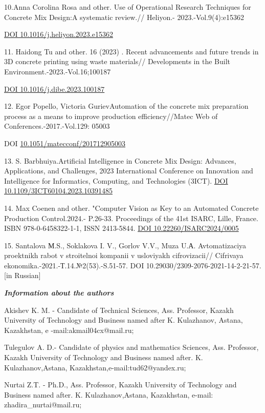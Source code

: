 {10.Anna Corolina Rosa and other. Use of Operational Research Techniques
for Concrete Mix Design:A systematic review.// Heliyon.-
2023.-Vol.9(4):e15362

\href{https://doi.org/10.1016/j.heliyon.2023.e15362}{DOI
10.1016/j.heliyon.2023.e15362}

11. Haidong Tu and other. 16 (2023) . Recent advancements and future
trends in 3D concrete printing using waste materials// Developments in
the Built Environment.-2023.-Vol.16;100187

\href{https://doi.org/10.1016/j.dibe.2023.100187}{DOI
10.1016/j.dibe.2023.100187}

12. Egor Popello, Victoria GurievAutomation of the concrete mix
preparation process as a means to improve production efficiency//Matec
Web of Conferences.-2017.-Vol.129: 05003

DOI
\href{http://dx.doi.org/10.1051/matecconf/201712905003}{10.1051/matecconf/201712905003}

13. S. Barbhuiya.Artificial Intelligence in Concrete Mix Design:
Advances, Applications, and Challenges, 2023 International Conference on
Innovation and Intelligence for Informatics, Computing, and Technologies
(3ICT). \href{http://dx.doi.org/10.1109/3ICT60104.2023.10391485}{DOI
10.1109/3ICT60104.2023.10391485}

14. Max Coenen and other. "Computer Vision as Key to an Automated
Concrete Production Control.2024.- P.26-33. Proceedings of the 41st
ISARC, Lille, France. ISBN 978-0-6458322-1-1, ISSN 2413-5844.
\href{https://doi.org/10.22260/ISARC2024/0005}{DOI
10.22260/ISARC2024/0005}

15. Santalova М.S., Soklakova I. V., Gorlov V.V., Muza U.А.
Avtomatizaciya proektnikh rabot v stroitelnoi kompanii v usloviyakh
cifrovizacii// Cifrivaya ekonomika.-2021.-Т.14.№2(53).-S.51-57. DOI
10.29030/2309-2076-2021-14-2-21-57. {[}in Russian{]}

\emph{{\bfseries Information about the authors}}

Akishev K. M. - Candidate of Technical Sciences, Ass. Professor, Kazakh
University of Technology and Business named after K. Kulazhanov, Astana,
Kazakhstan, e -mail:akmail04cx@mail.ru;

Tulegulov A. D.- Candidate of physics and mathematics Sciences, Ass.
Professor, Kazakh University of Technology and Business named after. K.
Kulazhanov,Astana, Kazakhstan,e-mail:tud62@yandex.ru;

Nurtai Z.T. - Ph.D., Ass. Professor, Kazakh University of Technology and
Business named after. K. Kulazhanov,Astana, Kazakhstan, e-mail:
zhadira\_nurtai@mail.ru;

}
